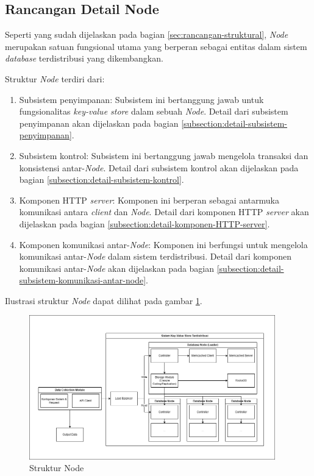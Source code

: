 \subsection{Rancangan Detail Node}
\label{subsection:detail-node}

Seperti yang sudah dijelaskan pada bagian \ref{sec:rancangan-struktural}, \textit{Node} merupakan satuan fungsional utama yang berperan sebagai entitas dalam sistem \textit{database} terdistribusi yang dikembangkan.

Struktur \textit{Node} terdiri dari:

\begin{enumerate}
    \item Subsistem penyimpanan: Subsistem ini bertanggung jawab untuk fungsionalitas \textit{key-value store} dalam sebuah \textit{Node}. Detail dari subsistem penyimpanan akan dijelaskan pada bagian \ref{subsection:detail-subsistem-penyimpanan}.
    \item Subsistem kontrol: Subsistem ini bertanggung jawab mengelola transaksi dan konsistensi antar-\textit{Node}. Detail dari subsistem kontrol akan dijelaskan pada bagian \ref{subsection:detail-subsistem-kontrol}.
    \item Komponen HTTP \textit{server}: Komponen ini berperan sebagai antarmuka komunikasi antara \textit{client} dan \textit{Node}. Detail dari komponen HTTP \textit{server} akan dijelaskan pada bagian \ref{subsection:detail-komponen-HTTP-server}.
    \item Komponen komunikasi antar-\textit{Node}: Komponen ini berfungsi untuk mengelola komunikasi antar-\textit{Node} dalam sistem terdistribusi. Detail dari komponen komunikasi antar-\textit{Node} akan dijelaskan pada bagian \ref{subsection:detail-subsistem-komunikasi-antar-node}.
\end{enumerate}

Ilustrasi struktur \textit{Node} dapat dilihat pada gambar \ref{fig:node-structure}.

\begin{figure}[ht]
    \centering
    \includegraphics[width=0.95\textwidth]{resources/chapter-3/general-architecture.png}
    \caption{Struktur Node}
    \label{fig:node-structure}
\end{figure}